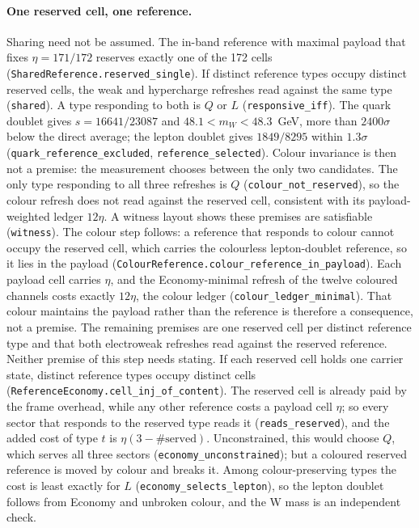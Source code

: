 \paragraph{One reserved cell, one reference.} Sharing need not be assumed. The in-band reference with maximal payload that fixes $\eta=171/172$ reserves exactly one of the 172 cells (\texttt{SharedReference.reserved\_single}). If distinct reference types occupy distinct reserved cells, the weak and hypercharge refreshes read against the same type (\texttt{shared}). A type responding to both is $Q$ or $L$ (\texttt{responsive\_iff}). The quark doublet gives $s=16641/23087$ and $48.1<m_W<48.3$~GeV, more than $2400\sigma$ below the direct average; the lepton doublet gives $1849/8295$ within $1.3\sigma$ (\texttt{quark\_reference\_excluded}, \texttt{reference\_selected}). Colour invariance is then not a premise: the measurement chooses between the only two candidates. The only type responding to all three refreshes is $Q$ (\texttt{colour\_not\_reserved}), so the colour refresh does not read against the reserved cell, consistent with its payload-weighted ledger $12\eta$. A witness layout shows these premises are satisfiable (\texttt{witness}). The colour step follows: a reference that responds to colour cannot occupy the reserved cell, which carries the colourless lepton-doublet reference, so it lies in the payload (\texttt{ColourReference.colour\_reference\_in\_payload}). Each payload cell carries $\eta$, and the Economy-minimal refresh of the twelve coloured channels costs exactly $12\eta$, the colour ledger (\texttt{colour\_ledger\_minimal}). That colour maintains the payload rather than the reference is therefore a consequence, not a premise. The remaining premises are one reserved cell per distinct reference type and that both electroweak refreshes read against the reserved reference. Neither premise of this step needs stating. If each reserved cell holds one carrier state, distinct reference types occupy distinct cells (\texttt{ReferenceEconomy.cell\_inj\_of\_content}). The reserved cell is already paid by the frame overhead, while any other reference costs a payload cell $\eta$; so every sector that responds to the reserved type reads it (\texttt{reads\_reserved}), and the added cost of type $t$ is $\eta(3-\#\text{served})$. Unconstrained, this would choose $Q$, which serves all three sectors (\texttt{economy\_unconstrained}); but a coloured reserved reference is moved by colour and breaks it. Among colour-preserving types the cost is least exactly for $L$ (\texttt{economy\_selects\_lepton}), so the lepton doublet follows from Economy and unbroken colour, and the W mass is an independent check.

